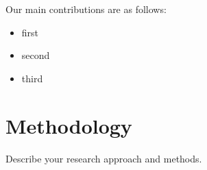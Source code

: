\documentclass[midterm]{sparreport}
\begin{document}
Our main contributions are as follows:

\begin{itemize}
  \item first
  \item second
  \item third
\end{itemize}



\section{Methodology}

Describe your research approach and methods.



\end{document}
